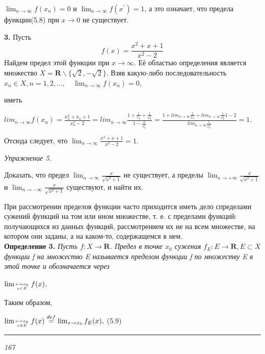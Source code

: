 \documentclass{article}
\begin{document}
\thispagestyle{empty}
\fontsize{13}{13}\selectfont
\noindent$\lim_{n \to \infty} f(x_{n}) = 0$ и $\lim_{n \to \infty} f(x^{'}) = 1$, а это означает, что предела
функции(5.8) при $x \to 0$ не существует.\par
\quad\textbf{3.} Пусть
\[f(x)=\frac{x^2 + x + 1}{x^2 - 2}\]
Найдем предел этой функции при $x \to \infty$. Её областью определения является множество $X = \textbf{R}\backslash\{\sqrt{2}, - \sqrt{2}\}$. Взяв какую-либо последовательность \(x_{n} \in X, n=1, 2, ... , \quad\lim_{n \to \infty} f(x_{n}) = 0\),\par
{} иметь\par
\begin{center}
    $lim_{n \to \infty} f(x_{n}) = \frac{x_{n}^2 + x_{n} + 1}{x_{n}^2 - 2} = lim_{n \to \infty} \frac{1 + \frac{1}{x_{n}} + \frac{1}{x_{n}^2}
    }{1 - \frac{2}{x_{n}^2}}=\frac{1 + lim_{n \to \infty} \frac{1}{x_{n}} + lim_{n \to \infty} \frac{1}{x_{n}^2}{1 - 2}}{lim_{n \to \infty} \frac{1}{x_{n}^2}}=1$.\par
\end{center}
Отсюда следует, что $\lim_{n \to \infty}{\frac{x^2 + x + 1}{x^2 - 2}}=1.$\par
\begin{large}
    \noindent\textit{Упражнение 5.}
\end{large}
\begin{small}
    Доказать, что предел $\lim_{n \to \infty}{\frac{x}{\sqrt{x^2 + 1}}}$ не существует, а
    пределы $\lim_{n \to +\infty}{\frac{x}{\sqrt{x^2 + 1}}}$ и $\lim_{n \to -\infty}{\frac{x}{\sqrt{x^2 + 1}}}$ существуют, и найти их.\par
\end{small}
При рассмотрении пределов функции часто приходится иметь дело спределами сужений функций на том или ином множестве,
т. е. с пределами функций: получающихся из данных функций, рассмотрением их не на всем множестве, на котором они заданы,
а на каком-то, содержащемся в нем.\\
\textbf{Определение 3.}
\textit{Пусть $f:X \to \textbf{R}$. Предел в точке $x_0$ сужения $f_E:E \to \textbf{R}, E \subset X$ функции f на множество E называется
пределом функции f по множеству E в этой точке и обозначается через}\par
\begin{center}
    $\lim_{x \to x_0 \atop x \in E} f(x)$.
\end{center}
Таким образом,
\begin{flushright}
    $\lim_{x \to x_0 \atop x \in E} f(x)\overset{def}{=}\lim_{x \to x_0} f_E(x),$ \phantom{\hspace{55pt}}(5.9)\par
\end{flushright}
\begin{center}
    \rule{50pt}{0.1pt}\par
    \textit{167}
\end{center}
\end{document}
